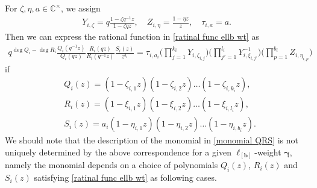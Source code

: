 \documentclass[12pt]{amsart}
\numberwithin{equation}{thm}
\newcommand\CC{\mathbb C}
\newcommand\bb{\mathbf b}
\newcommand\z{\zeta}
\newcommand\Bg{\boldsymbol\gamma}
\newcounter{ni}
\begin{document}
For $\z, \eta, a \in \CC^{\times}$, 
we assign 
\begin{align*}
Y_{i,\z} = q \frac{1 - \z q^{-1} z}{1 - \z q z}, 
\quad 
Z_{i, \eta} =\frac{1 - \eta z}{z}, 
\quad 
\tau_{i,a} =a. 
\end{align*}
Then we can express the rational function in \eqref{ratinal func ellb wt} as 
\begin{align}
\label{monomial QRS} 
 q^{\deg Q_i - \deg R_i} \frac{ Q_i ( q^{-1} z)}{ Q_i (q z)} \frac{ R_i (q z)}{ R_i (q^{-1} z)} \frac{ S_i (z) }{ z^{b_i}} 
 = \tau_{i, a_i} \big( \prod_{j=1}^{k_i} Y_{i, \z_{i,j}} \big) \big( \prod_{j'=1}^{l_i} Y_{i, \xi_{i, j'}}^{-1} \big) 
 	\big( \prod_{p=1}^{b_i} Z_{i, \eta_{i,p}}  \big) 
\end{align}
if 
\begin{align*}
& Q_i (z) = (1 - \z_{i,1} z) (1 - \z_{i,2} z) \dots (1 - \z_{i, k_i} z), 
\\
& R_i(z) = (1 - \xi_{i,1} z) (1 - \xi_{i,2} z) \dots ( 1 - \xi_{i, l_i} z), 
\\
& S_i (z) = a_i (1 - \eta_{i,1} z) (1 - \eta_{i,2} z) \dots (1 - \eta_{i, b_i} z).
\end{align*}
We should note that 
the description of the monomial in \eqref{monomial QRS} is not uniquely determined by the above correspondence  
for a given $\ell_{[\bb]}$-weight $\Bg$,   
namely the monomial depends on a choice of polynomials $Q_i(z)$, $R_i(z)$ and $S_i(z)$ satisfying \eqref{ratinal func ellb wt} 
as following cases. 
\end{document}
